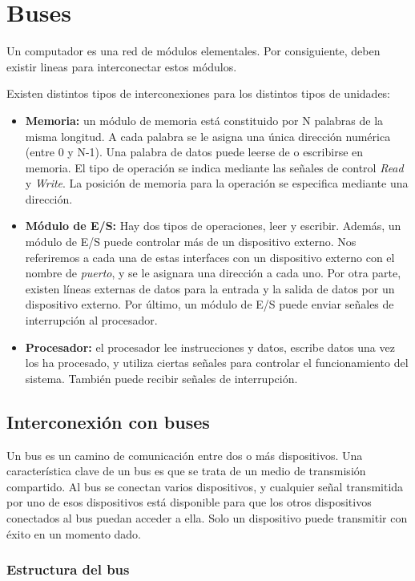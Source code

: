 \section{Buses}

Un computador es una red de módulos elementales. Por consiguiente, deben existir lineas para interconectar estos módulos.

Existen distintos tipos de interconexiones para los distintos tipos de unidades:

\begin{itemize}
  \item \textbf{Memoria:} un módulo de memoria está constituido por N palabras de la misma longitud. A cada palabra se le asigna una única dirección numérica (entre 0 y N-1). Una palabra de datos puede leerse de o escribirse en memoria. El tipo de operación se indica mediante las señales de control \textit{Read} y \textit{Write}. La posición de memoria para la operación se especifica mediante una dirección.
  \item \textbf{Módulo de E/S:} Hay dos tipos de operaciones, leer y escribir. Además, un módulo de E/S puede controlar más de un dispositivo externo. Nos referiremos a cada una de estas interfaces con un dispositivo externo con el nombre de \textit{puerto}, y se le asignara una dirección a cada uno. Por otra parte, existen líneas externas de datos para la entrada y la salida de datos por un dispositivo externo. Por último, un módulo de E/S puede enviar señales de interrupción al procesador.
  \item\textbf{Procesador:} el procesador lee instrucciones y datos, escribe datos una vez los ha procesado, y utiliza ciertas señales para controlar el funcionamiento del sistema. También puede recibir señales de interrupción.
\end{itemize}

\subsection{Interconexión con buses}

Un bus es un camino de comunicación entre dos o más dispositivos. Una característica clave de un bus es que se trata de un medio de transmisión compartido. Al bus se conectan varios dispositivos, y cualquier señal transmitida por uno de esos dispositivos está disponible para que los otros dispositivos conectados al bus puedan acceder a ella. Solo un dispositivo puede transmitir con éxito en un momento dado.

\subsubsection{Estructura del bus}

